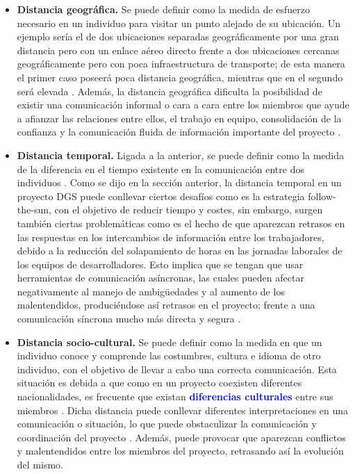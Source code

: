 \begin{itemize}
	\item \textbf{Distancia geográfica.} Se puede definir como la medida de esfuerzo necesario en un individuo para visitar un punto alejado de su ubicación. Un ejemplo sería el de dos ubicaciones separadas geográficamente por una gran distancia pero con un enlace aéreo directo frente a dos ubicaciones cercanas geográficamente pero con poca infraestructura de transporte; de esta manera el primer caso poseerá poca distancia geográfica, mientras que en el segundo será elevada \cite{vizcaino2015vision}. Además, la distancia geográfica dificulta la posibilidad de existir una comunicación informal o cara a cara entre los miembros que ayude a afianzar las relaciones entre ellos, el trabajo en equipo, consolidación de la confianza y la comunicación fluida de información importante del proyecto \cite{conchuir2006exploring}.
	
	\item \textbf{Distancia temporal.} Ligada a la anterior, se puede definir como la medida de la diferencia en el tiempo existente en la comunicación entre dos individuos \cite{vizcaino2015vision}. Como se dijo en la sección anterior, la distancia temporal en un proyecto DGS puede conllevar ciertos desafíos como es la estrategia follow-the-sun, con el objetivo de reducir tiempo y costes, sin embargo, surgen también ciertas problemáticas como es el hecho de que aparezcan retrasos en las respuestas en los intercambios de información entre los trabajadores, debido a la reducción del solapamiento de horas en las jornadas laborales de los equipos de desarrolladores. Esto implica que se tengan que usar herramientas de comunicación asíncronas, las cuales pueden afectar negativamente al manejo de ambigüedades y al aumento de los malentendidos, produciéndose así retrasos en el proyecto; frente a una comunicación síncrona mucho más directa y segura \cite{conchuir2006exploring}.
	
	\item \textbf{Distancia socio-cultural.} Se puede definir como la medida en que un individuo conoce y comprende las costumbres, cultura e idioma de otro individuo, con el objetivo de llevar a cabo una correcta comunicación. Esta situación es debida a que como en un proyecto coexisten diferentes nacionalidades, es frecuente que existan \textbf{\textcolor{blue}{diferencias culturales}} entre sus miembros \cite{vizcaino2015vision}. Dicha distancia puede conllevar diferentes interpretaciones en una comunicación o situación, lo que puede obstaculizar la comunicación y coordinación del proyecto \cite{conchuir2006exploring}. Además, puede provocar que aparezcan conflictos y malentendidos entre los miembros del proyecto, retrasando así la evolución del mismo.
\end{itemize}

